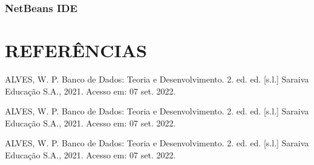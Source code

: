 \documentclass[a4paper,12pt]{article}
\begin{document}
\subsubsection{NetBeans IDE}


\pagebreak
\centering \section*{REFERÊNCIAS}
\vspace{1cm}

\raggedright
\noindent ALVES, W. P. Banco de Dados: Teoria e Desenvolvimento. 2. ed. ed. [s.l.] Saraiva Educação S.A., 2021. Acesso em: 07 set. 2022. \linebreak 

\noindent ALVES, W. P. Banco de Dados: Teoria e Desenvolvimento. 2. ed. ed. [s.l.] Saraiva Educação S.A., 2021. Acesso em: 07 set. 2022. \linebreak 

\noindent ALVES, W. P. Banco de Dados: Teoria e Desenvolvimento. 2. ed. ed. [s.l.] Saraiva Educação S.A., 2021. Acesso em: 07 set. 2022. \linebreak 

\end{document}

